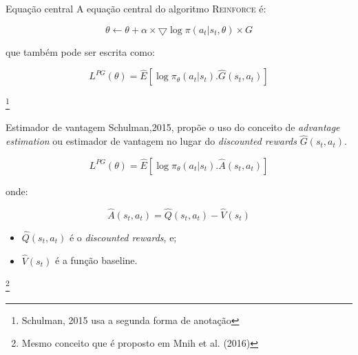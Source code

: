 \documentclass{beamer}
\begin{document}
\begin{frame}{Equação central}
	A equação central do algoritmo \textsc{Reinforce} é: 
	
	\begin{equation}
		\theta \leftarrow \theta + \alpha \times \bigtriangledown \log \pi(a_{t}|s_{t}, \theta) \times G
	\end{equation}

	que também pode ser escrita como: 
	
	\begin{equation}
		L^{PG}(\theta) = \hat{E} \left[ \log \pi_{\theta}(a_{t}|s_{t}).\hat{G}(s_{t},a_{t}) \right]
	\end{equation}
	
	\footnote{Schulman, 2015 usa a segunda forma de anotação}
	
\end{frame}

\begin{frame}{Estimador de vantagem}
	Schulman,2015, propõe o uso do conceito de \textit{advantage estimation} ou estimador de vantagem no lugar do \textit{discounted rewards} $\hat{G}(s_{t},a_{t})$. 
	
	\begin{equation}
	L^{PG}(\theta) = \hat{E} \left[ \log \pi_{\theta}(a_{t}|s_{t}).\hat{A}(s_{t},a_{t}) \right]
	\end{equation}	
	
	onde: 
	
	\begin{equation}
		\hat{A}(s_{t},a_{t}) = \hat{Q}(s_{t},a_{t}) - \hat{V}(s_{t})
	\end{equation}

\begin{itemize}
	\item $\hat{Q}(s_{t},a_{t})$ é o \textit{discounted rewards}, e;
	\item $\hat{V}(s_{t})$ é a função baseline.
\end{itemize}	

\footnote{Mesmo conceito que é proposto em Mnih et al. (2016)}

\end{frame}


\end{document}
